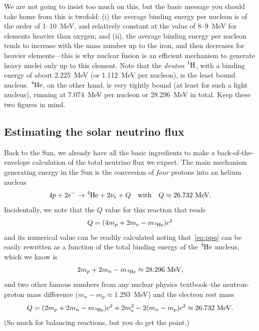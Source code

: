 We are not going to insist too much on this, but the basic message you should
take home from this is twofold: (i) the average binding energy per nucleon is
of the order of 1--10~MeV, and relatively constant at the value of 8--9~MeV for
elements heavier than oxygen; and (ii), the average binding energy per nucleon
tends to increase with the mass number up to the iron, and then decreases for
heavier elements---this is why nuclear fusion is an efficient mechanism to
generate heavy nuclei only up to this element. Note that the \emph{deuton}
$\ce{^1H}$, with a binding energy of about 2.225~MeV (or 1.112~MeV per nucleon),
is the least bound nucleus. $\ce{^4He}$, on the other hand, is very tightly
bound (at least for such a light nucleus), running at 7.074~MeV per nucleon or
28.296~MeV in total. Keep these two figures in mind.


\subsection{Estimating the solar neutrino flux}

Back to the Sun, we already have all the basic ingredients to make a
back-of-the-envelope calculation of the total neutrino flux we expect.
The main mechanism generating energy in the Sun is the conversion of \emph{four}
protons into an helium nucleus
\begin{align}\label{eq:ppq}
  4p + 2 e^- \rightarrow \ce{^4He} + 2\nu_e + Q
  \quad\text{with}\quad Q \approx 26.732~\text{MeV}.
\end{align}
Incidentally, we note that the $Q$ value for this reaction that reads
\begin{align*}
  Q = (4m_p + 2m_e - m_{\ce{^4He}}) c^2
\end{align*}
and its numerical value can be readily calculated noting that~\eqref{eq:ppq}
can be easily rewritten as a function of the total binding energy of the
$\ce{^4He}$ nucleus, which we know is
\begin{align*}
  2 m_p + 2 m_n - m_{\ce{^4He}} \approx 28.296~\text{MeV},
\end{align*}
and two other famous numbers from any nuclear physics textbook--the neutron-proton
mass difference ($m_n - m_p \approx 1.293$~MeV) and the electron rest mass
\begin{align*}
  Q = (2 m_p + 2 m_n - m_{\ce{^4He}}) c^2 + 2 m_e^2 - 2 (m_n - m_p) c^2
  \approx 26.732~\text{MeV}.
\end{align*}
(So much for balancing reactions, but you do get the point.)


